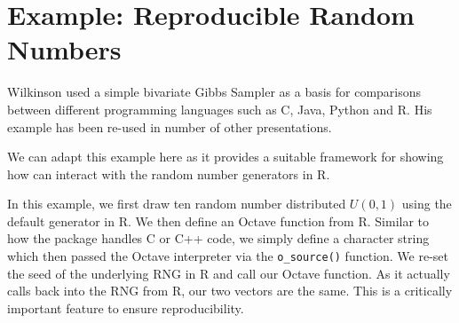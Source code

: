 

\section{Example: Reproducible Random Numbers}

Wilkinson used a simple bivariate Gibbs Sampler as a basis for comparisons
between different programming languages such as C, Java, Python and R. His
example has been re-used in number of other presentations.

We can adapt this example here as it provides a suitable framework for
showing how  can interact with the random number generators
in R.

{\small
\begin{knitrout}
\color{fgcolor}
\end{knitrout}

}

In this example, we first draw ten random number distributed $U(0,1)$ using
the default generator in R. We then define an Octave function from R. Similar
to how the  package \citep{CRAN:inline} handles C or C++ code, we
simply define a character string which then passed the Octave interpreter via
the \verb|o_source()| function.  We re-set the seed of the underlying RNG in
R and call our Octave function. As it actually calls back into the RNG from
R, our two vectors are the same.  This is a critically important feature to
ensure reproducibility.

